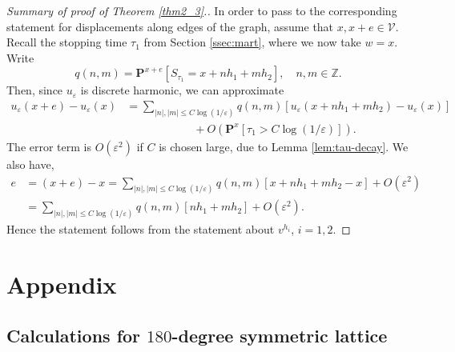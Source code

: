 \documentclass[11pt]{article}
\theoremstyle{remark}
\def\eps{\varepsilon}
\def\Z{\mathbb{Z}}
\def\Pr{\mathbf{P}}
\def\cV{\mathcal{V}}
\newcommand{\eqnsplst}[1]{\begin{equation*}\begin{split}%
   #1\end{split}\end{equation*}}
\begin{document}
\begin{proof}[Summary of proof of Theorem \ref{thm2_3}.]
In order to pass to the corresponding statement for displacements along edges of the graph, assume that 
$x, x+e \in \cV$. Recall the stopping time $\tau_1$ from Section \ref{ssec:mart}, where we now take 
$w = x$. Write
\[ q(n,m) 
   = \Pr^{x+e} [ S_{\tau_1} = x + n h_1 + m h_2 ], \quad n, m \in \Z. \]
Then, since $u_\eps$ is discrete harmonic, we can approximate
\eqnsplst{ 
   u_\eps(x+e) - u_\eps(x)
   &= \sum_{|n|, |m| \le C \log (1/\eps)} q(n,m) [ u_\eps(x + n h_1 + m h_2) - u_\eps(x) ] \\
   &\qquad\qquad\qquad + 
     O( \Pr^x [\tau_1 > C \log(1/\eps)] ). }
The error term is $O( \eps^2 )$ if $C$ is chosen large, due to Lemma \ref{lem:tau-decay}. We also have, 
\eqnsplst{
   e
   &= (x+e) - x
   = \sum_{|n|, |m| \le C \log (1/\eps)} q(n,m) [ x + n h_1 + m h_2 - x ] + O( \eps^2 ) \\
   &= \sum_{|n|, |m| \le C \log (1/\eps)} q(n,m) [ n h_1 + m h_2 ] + O( \eps^2 ). }
Hence the statement follows from the statement about $v^{h_i}$, $i=1,2$.
\end{proof}


\section{Appendix}
\label{sec:calculations}


\subsection{Calculations for $180$-degree symmetric lattice}
\label{ssec:xy-lattice}
\end{document}
